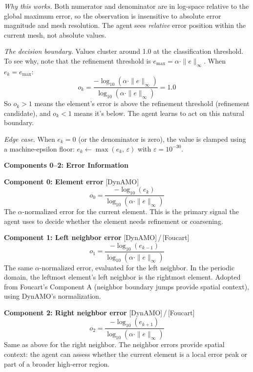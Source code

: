 \documentclass[11pt]{article}
\newcommand{\provdynamo}{\textcolor{dynamo}{\textsf{[DynAMO]}}}
\newcommand{\provboth}{\textcolor{dynamo}{\textsf{[DynAMO]}}\,/\,\textcolor{foucart}{\textsf{[Foucart]}}}
\begin{document}
\noindent\textit{Why this works.} Both numerator and denominator are in log-space relative to the global maximum error, so the observation is insensitive to absolute error magnitude and mesh resolution. The agent sees \textit{relative} error position within the current mesh, not absolute values.

\vspace{0.2cm}
\noindent\textit{The decision boundary.} Values cluster around 1.0 at the classification threshold. To see why, note that the refinement threshold is $e_{\max} = \alpha \cdot \|e\|_\infty$. When $e_k = e_{\max}$:
\[
o_k = \frac{-\log_{10}(\alpha \cdot \|e\|_\infty)}{\log_{10}(\alpha \cdot \|e\|_\infty)} = 1.0
\]
So $o_k > 1$ means the element's error is above the refinement threshold (refinement candidate), and $o_k < 1$ means it's below. The agent learns to act on this natural boundary.

\vspace{0.2cm}
\noindent\textit{Edge case.} When $e_k = 0$ (or the denominator is zero), the value is clamped using a machine-epsilon floor: $e_k \leftarrow \max(e_k, \, \varepsilon)$ with $\varepsilon = 10^{-30}$.

\vspace{0.5cm}
\noindent\textbf{Components 0--2: Error Information}

\vspace{0.2cm}
\noindent\textbf{Component 0: Element error} \provdynamo
\[
o_0 = \frac{-\log_{10}(e_k)}{\log_{10}(\alpha \cdot \|e\|_\infty)}
\]
The $\alpha$-normalized error for the current element. This is the primary signal the agent uses to decide whether the element needs refinement or coarsening.

\vspace{0.3cm}
\noindent\textbf{Component 1: Left neighbor error} \provboth
\[
o_1 = \frac{-\log_{10}(e_{k-1})}{\log_{10}(\alpha \cdot \|e\|_\infty)}
\]
The same $\alpha$-normalized error, evaluated for the left neighbor. In the periodic domain, the leftmost element's left neighbor is the rightmost element. Adopted from Foucart's Component A (neighbor boundary jumps provide spatial context), using DynAMO's normalization.

\vspace{0.3cm}
\noindent\textbf{Component 2: Right neighbor error} \provboth
\[
o_2 = \frac{-\log_{10}(e_{k+1})}{\log_{10}(\alpha \cdot \|e\|_\infty)}
\]
Same as above for the right neighbor. The neighbor errors provide spatial context: the agent can assess whether the current element is a local error peak or part of a broader high-error region.
\end{document}

